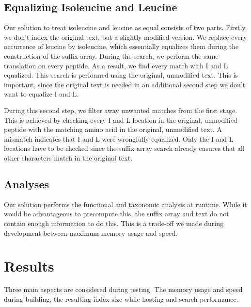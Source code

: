 \documentclass[11pt]{article}
\begin{document}
\begin{multicols}{2}
        \subsection{Equalizing Isoleucine and Leucine}
        Our solution to treat isoleucine and leucine as equal consists of two parts.
        Firstly, we don't index the original text, but a slightly modified version.
        We replace every occurrence of leucine by isoleucine, which essentially equalizes them during the construction of the suffix array.
        During the search, we perform the same translation on every peptide.
        As a result, we find every match with I and L equalized.
        This search is performed using the original, unmodified text.
        This is important, since the original text is needed in an additional second step we don't want to equalize I and L\@.

        During this second step, we filter away unwanted matches from the first stage.
        This is achieved by checking every I and L location in the original, unmodified peptide with the matching amino acid in the original, unmodified text.
        A mismatch indicates that I and L were wrongfully equalized.
        Only the I and L locations have to be checked since the suffix array search already ensures that all other characters match in the original text.

        \subsection{Analyses}
        Our solution performs the functional and taxonomic analysis at runtime.
        While it would be advantageous to precompute this, the suffix array and text do not contain enough information to do this.
        This is a trade-off we made during development between maximum memory usage and speed.


        \section{Results}\label{sec:results}
        Three main aspects are considered during testing.
        The memory usage and speed during building, the resulting index size while hosting and search performance.


\end{multicols}
\end{document}
